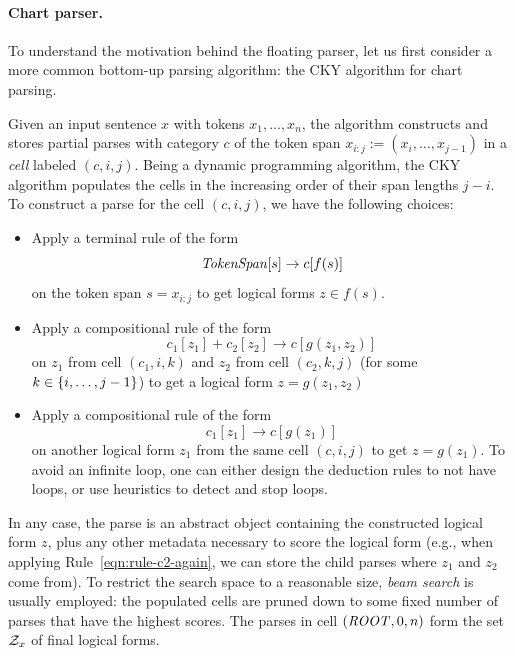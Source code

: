 \paragraph{Chart parser.}
To understand the motivation behind the floating parser,
let us first consider a more common bottom-up parsing algorithm:
the CKY algorithm for chart parsing.

Given an input sentence $x$ with tokens $x_1, \dots, x_n$,
the algorithm constructs and stores partial parses
with category $c$
of the token span $x_{i:j} := (x_i, \dots, x_{j-1})$
in a \emph{cell} labeled $(c, i, j)$.
Being a dynamic programming algorithm,
the CKY algorithm populates the cells in the increasing order
of their span lengths $j - i$.
To construct a parse for the cell $(c, i, j)$,
we have the following choices:
\begin{itemize}
\item Apply a terminal rule of the form
\begin{equation*}
\text{\emph{TokenSpan}}[s] \to c[f(s)]
\end{equation*}
on the token span $s = x_{i:j}$ to get logical forms $z \in f(s)$.
\item Apply a compositional rule of the form
\begin{equation*}
c_1[z_1] + c_2[z_2] \to c[g(z_1, z_2)]
\label{eqn:rule-c2-again}
\end{equation*}
on $z_1$ from cell $(c_1, i, k)$ and
$z_2$ from cell $(c_2, k, j)$ (for some $k \in \left\{ i,\dots,j-1 \right\}$)
to get a logical form $z = g(z_1, z_2)$
\item Apply a compositional rule of the form
\begin{equation*}
c_1[z_1] \to c[g(z_1)]
\end{equation*}
on another logical form $z_1$ from the same cell $(c, i, j)$
to get $z = g(z_1)$.
To avoid an infinite loop,
one can either design the deduction rules
to not have loops,
or use heuristics to detect and stop loops.
\end{itemize}

In any case, the parse is an abstract object containing
the constructed logical form $z$, plus any other metadata necessary
to score the logical form (e.g., when applying
Rule~\ref{eqn:rule-c2-again}, we can store the child parses
where $z_1$ and $z_2$ come from).
To restrict the search space to a reasonable size,
\emph{beam search} is usually employed:
the populated cells are pruned down to some
fixed number of parses that have the highest scores.
The parses in cell $(\text{\emph{ROOT}}, 0, n)$
form the set $\mathcal{Z}_x$ of final logical forms.

